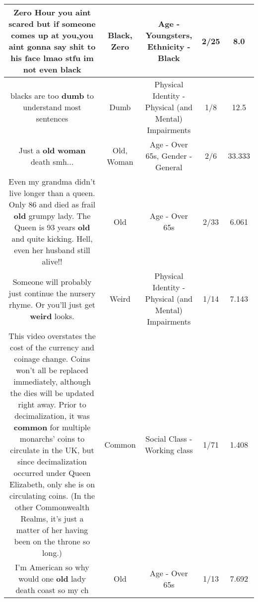 \documentclass[11pt]{article}
\newlength\mylength
\begin{document}
\begin{center}
\begin{longtable}{|C{.65\mylength}|C{.30\mylength}|C{.12\mylength}|C{.12\mylength}|C{.12\mylength}|}
  \small Zero Hour you aint scared but if someone comes up at you,you aint gonna say shit to his face lmao stfu im not even black\normalsize   & Black, Zero & Age - Youngsters, Ethnicity - Black & 2/25 & 8.0 \\  \hline
  \small blacks are too \textbf{dumb} to understand most sentences\normalsize   & Dumb & Physical Identity - Physical (and Mental) Impairments & 1/8 & 12.5 \\  \hline
  \small Just a \textbf{old} \textbf{woman} death smh...\normalsize   & Old, Woman & Age - Over 65s, Gender - General & 2/6 & 33.333 \\  \hline
  \small Even my grandma didn't live longer than a queen. Only 86 and died as frail \textbf{old} grumpy lady. The Queen is 93 years \textbf{old} and quite kicking. Hell, even her husband still alive!!\normalsize   & Old & Age - Over 65s & 2/33 & 6.061 \\  \hline
  \small Someone will probably just continue the nursery rhyme. Or you'll just get \textbf{weird} looks.\normalsize   & Weird & Physical Identity - Physical (and Mental) Impairments & 1/14 & 7.143 \\  \hline
  \small This video overstates the cost of the currency and coinage change.  Coins won't all be replaced immediately, although the dies will be updated right away.  Prior to decimalization, it was \textbf{common} for multiple monarchs' coins to circulate in the UK, but since decimalization occurred under Queen Elizabeth, only she is on circulating coins. (In the other Commonwealth Realms, it's just a matter of her having been on the throne so long.)\normalsize   & Common & Social Class - Working class & 1/71 & 1.408 \\  \hline
  \small I'm American so why would one \textbf{old} lady death coast so my ch\normalsize   & Old & Age - Over 65s & 1/13 & 7.692 \\  \hline

\end{longtable}
\end{center}
\end{document}
